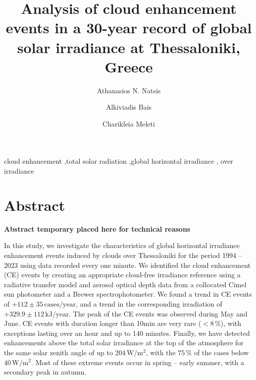 \documentclass[preprint, 5p,
authoryear]{elsarticle} %
\begin{document}
\begin{frontmatter}

  \title{Analysis of cloud enhancement events in a 30-year record of
global solar irradiance at Thessaloniki, Greece}
    \author[LAP]{Athanasios N. Natsis%
  }
    \author[LAP]{Alkiviadis Bais%
  }
    \author[LAP]{Charikleia Meleti%
  }
  
  \begin{abstract}
  
  \end{abstract}
    \begin{keyword}
    cloud enhancement \sep total solar radiation \sep global horizontal
irradiance \sep 
    over irradiance
  \end{keyword}
  
 \end{frontmatter}

\hypertarget{abstract}{%
\section*{Abstract}\label{abstract}}

\textbf{Abstract temporary placed here for technical reasons}

In this study, we investigate the characteristics of global horizontal
irradiance enhancement events induced by clouds over Thessaloniki for
the period 1994 -- 2023 using data recorded every one minute. We
identified the cloud enhancement (CE) events by creating an appropriate
cloud-free irradiance reference using a radiative transfer model and
aerosol optical depth data from a collocated Cimel sun photometer and a
Brewer spectrophotometer. We found a trend in CE events of
\(+112\pm 35\,\text{cases}/\text{year}\), and a trend in the
corresponding irradiation of \(+329.9\pm 112\,\text{kJ}/\text{year}\).
The peak of the CE events was observed during May and June. CE events
with duration longer than 10\nobreakspace{}min are very rare
(\(<8\,\%\)), with exceptions lasting over an hour and up to 140
minutes. Finally, we have detected enhancements above the total solar
irradiance at the top of the atmosphere for the same solar zenith angle
of up to \(204\,\text{W}/\text{m}^{2}\), with the \(75\,\%\) of the
cases below \(40\,\text{W}/\text{m}^{2}\). Most of these extreme events
occur in spring -- early summer, with a secondary peak in autumn.
\end{document}

